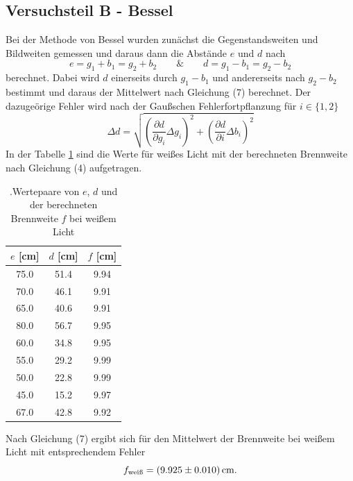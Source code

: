 \subsection{Versuchsteil B - Bessel}
Bei der Methode von Bessel wurden zunächst die Gegenstandsweiten und Bildweiten gemessen und daraus dann die Abstände $e$ und $d$ nach
\begin{equation}
    e = g_1 + b_1 = g_2 + b_2 \qquad \text{\&} \qquad d = g_1 - b_1 = g_2 - b_2
\end{equation}
berechnet.
Dabei wird $d$ einerseits durch $g_1 - b_1$ und andererseits nach $g_2 - b_2$ bestimmt und daraus der Mittelwert nach Gleichung (7) berechnet.
Der dazugeörige Fehler wird nach der Gaußschen Fehlerfortpflanzung für $i \in \{1,2\}$
\begin{equation}
    \label{eqn:Gauss}
    \Delta d = \sqrt{\left ( \frac{\partial d}{\partial g_i} \Delta g_i \right )^2 + \left ( \frac{\partial d}{\partial i} \Delta b_i \right )^2} 
\end{equation}
In der Tabelle \ref{tab:dos} sind die Werte für weißes Licht mit der berechneten Brennweite nach Gleichung (4) aufgetragen.

\begin{table}[H]
    \begin{center}
      \caption{.Wertepaare von $e$, $d$ und der berechneten Brennweite $f$ bei weißem Licht}
      \label{tab:dos}
      \begin{tabular}{c|c|c} 
        \textbf{$e$ [cm]} & \textbf{$d$ [cm]} & \textbf{$f$ [cm]}\\
        \hline
        75.0 & 51.4 & 9.94 \\
        70.0 & 46.1 & 9.91 \\
        65.0 & 40.6 & 9.91 \\
        80.0 & 56.7 & 9.95 \\
        60.0 & 34.8 & 9.95 \\
        55.0 & 29.2 & 9.99 \\
        50.0 & 22.8 & 9.99 \\
        45.0 & 15.2 & 9.97 \\
        67.0 & 42.8 & 9.92
      \end{tabular}
    \end{center}
\end{table}

Nach Gleichung (7) ergibt sich für den Mittelwert der Brennweite bei weißem Licht mit entsprechendem Fehler
\begin{equation}
    f_\text{wei\ss{}} = \SI{9.925 \pm 0.010}{cm}.     \notag
\end{equation}

